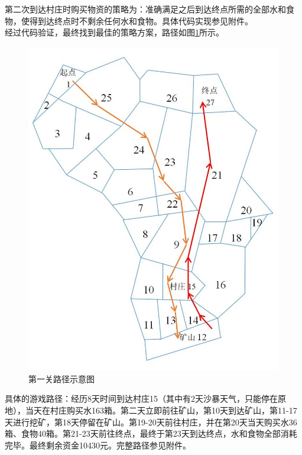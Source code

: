 \documentclass[withoutpre]{cumcmthesis} %
\begin{document}
第二次到达村庄时购买物资的策略为：准确满足之后到达终点所需的全部水和食物，使得到达终点时不剩余任何水和食物。具体代码实现参见附件。\\

经过代码验证，最终找到最佳的策略方案，路径如图\ref{fig:map1word}所示。
\begin{figure}[h]
	\centering
	\includegraphics[scale=0.5]{figures/map1word.jpg}
	\caption{第一关路径示意图}
	\label{fig:map1word}
\end{figure}

具体的游戏路径：经历8天时间到达村庄15（其中有2天沙暴天气，只能停在原地），当天在村庄购买水163箱。第二天立即前往矿山，第10天到达矿山，第11-17天进行挖矿，第18天停留在矿山。第19-20天前往村庄，并在第20天当天购买水36箱、食物40箱。第21-23天前往终点，最终于第23天到达终点，水和食物全部消耗完毕。最终剩余资金10430元。完整路径参见附件。
\end{document}
